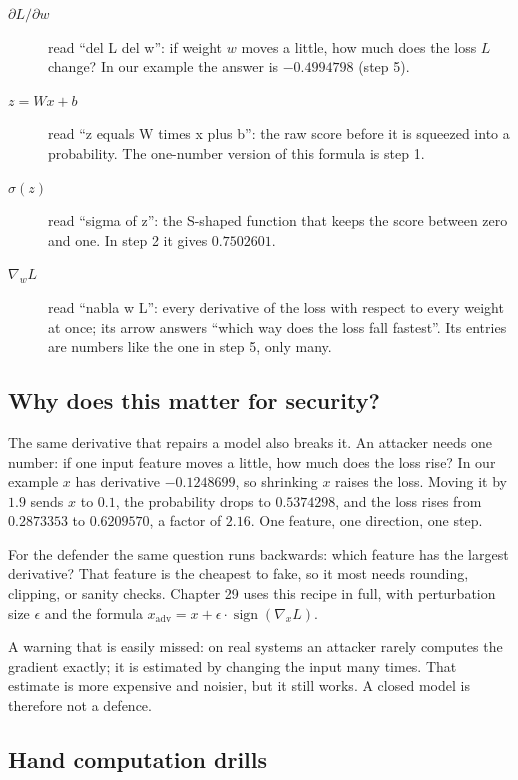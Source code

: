 \begin{description}
  \item[$\partial L/\partial w$] read ``del L del w'': if weight $w$ moves a little, how
        much does the loss $L$ change? In our example the answer is $-0.4994798$ (step 5).
  \item[$z = Wx + b$] read ``z equals W times x plus b'': the raw score before it is
        squeezed into a probability. The one-number version of this formula is step 1.
  \item[$\sigma(z)$] read ``sigma of z'': the S-shaped function that keeps the score
        between zero and one. In step 2 it gives $0.7502601$.
  \item[$\nabla_w L$] read ``nabla w L'': every derivative of the loss with respect to
        every weight at once; its arrow answers ``which way does the loss fall fastest''.
        Its entries are numbers like the one in step 5, only many.
\end{description}

\subsection{Why does this matter for security?}

The same derivative that repairs a model also breaks it. An attacker needs one number: if
one input feature moves a little, how much does the loss rise? In our example $x$ has
derivative $-0.1248699$, so shrinking $x$ raises the loss. Moving it by $1.9$ sends $x$ to
$0.1$, the probability drops to $0.5374298$, and the loss rises from $0.2873353$ to
$0.6209570$, a factor of $2.16$. One feature, one direction, one step.

For the defender the same question runs backwards: which feature has the largest
derivative? That feature is the cheapest to fake, so it most needs rounding, clipping, or
sanity checks. Chapter 29 uses this recipe in full, with perturbation size $\epsilon$ and
the formula $x_{\mathrm{adv}} = x + \epsilon \cdot \operatorname{sign}(\nabla_x L)$.

\begin{catatan}
A warning that is easily missed: on real systems an attacker rarely computes the gradient
exactly; it is estimated by changing the input many times. That estimate is more expensive
and noisier, but it still works. A closed model is therefore not a defence.
\end{catatan}

\subsection{Hand computation drills}

